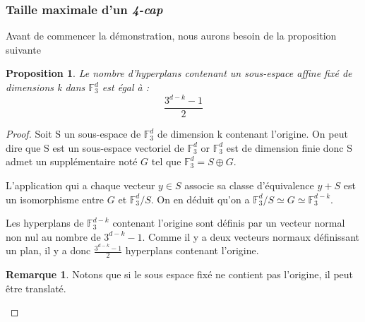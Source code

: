 \documentclass[a4paper,12pt,titlepage]{article}
\theoremstyle{plain}
\newtheorem{prop}{Proposition}
\theoremstyle{definition}
\newtheorem{rmq}{Remarque}
\newcommand{\Ftrois}[1]{\mathbb{F}^#1_3}
\begin{document}
\subsubsection{Taille maximale d'un \emph{4-cap}}
Avant de commencer la démonstration, nous aurons besoin de la proposition suivante
\begin{prop} \label{prop:nbhyp}
Le nombre d'hyperplans contenant un sous-espace affine fixé de dimensions k dans $\Ftrois{d}$ est égal à :
\[
\frac{3^{d-k}-1}{2}
\]
\end{prop}
\begin{proof}
Soit S un sous-espace de $\Ftrois{d}$ de dimension k contenant l'origine. On peut dire que S est un sous-espace vectoriel de $\Ftrois{d}$ or $\Ftrois{d}$ est de dimension finie donc S admet un supplémentaire noté $G$ tel que $\Ftrois{d} = S \oplus G$.

L'application qui a chaque vecteur $y\in S$ associe sa classe d'équivalence $y + S$ est un isomorphisme entre $G$ et $\Ftrois{d}/S$. On en déduit qu'on a $\Ftrois{d}/S \simeq G \simeq \Ftrois{{d-k}}$.

Les hyperplans de $\Ftrois{{d-k}}$ contenant l'origine sont définis par un vecteur normal non nul au nombre de $3^{d-k}-1$. Comme il y a deux vecteurs normaux définissant un plan, il y a donc $\frac{3^{d-k}-1}{2}$ hyperplans contenant l'origine.
\begin{rmq}
Notons que si le sous espace fixé ne contient pas l'origine, il peut être translaté.
\end{rmq}
\end{proof}
\end{document}
